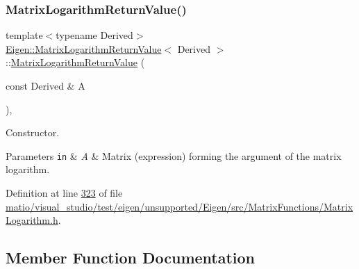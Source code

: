\subsubsection{\texorpdfstring{Matrix\+Logarithm\+Return\+Value()}{MatrixLogarithmReturnValue()}\hspace{0.1cm}{\footnotesize\ttfamily [2/2]}}
{\footnotesize\ttfamily template$<$typename Derived$>$ \\
\hyperlink{class_eigen_1_1_matrix_logarithm_return_value}{Eigen\+::\+Matrix\+Logarithm\+Return\+Value}$<$ Derived $>$\+::\hyperlink{class_eigen_1_1_matrix_logarithm_return_value}{Matrix\+Logarithm\+Return\+Value} (\begin{DoxyParamCaption}\item[{const Derived \&}]{A }\end{DoxyParamCaption})\hspace{0.3cm}{\ttfamily [inline]}, {\ttfamily [explicit]}}



Constructor. 


\begin{DoxyParams}[1]{Parameters}
\mbox{\tt in}  & {\em A} & Matrix (expression) forming the argument of the matrix logarithm. \\
\hline
\end{DoxyParams}


Definition at line \hyperlink{matio_2visual__studio_2test_2eigen_2unsupported_2_eigen_2src_2_matrix_functions_2_matrix_logarithm_8h_source_l00323}{323} of file \hyperlink{matio_2visual__studio_2test_2eigen_2unsupported_2_eigen_2src_2_matrix_functions_2_matrix_logarithm_8h_source}{matio/visual\+\_\+studio/test/eigen/unsupported/\+Eigen/src/\+Matrix\+Functions/\+Matrix\+Logarithm.\+h}.



\subsection{Member Function Documentation}
\mbox{\label{class_eigen_1_1_matrix_logarithm_return_value_ac17537a51ce53a44746fabd7a83d29d3}} 
